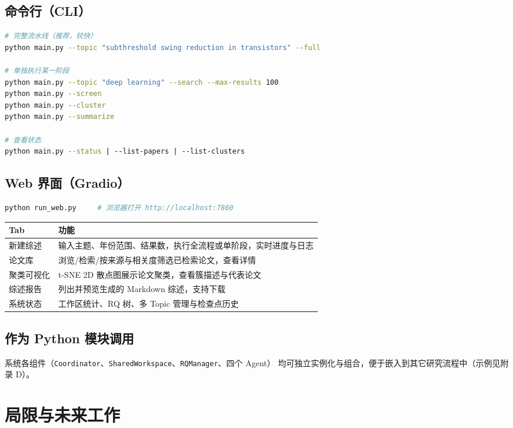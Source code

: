 \documentclass[10pt,a4paper]{article}
\begin{document}
\subsection{命令行（CLI）}
\begin{lstlisting}[language=bash]
# 完整流水线（推荐，较快）
python main.py --topic "subthreshold swing reduction in transistors" --full

# 单独执行某一阶段
python main.py --topic "deep learning" --search --max-results 100
python main.py --screen
python main.py --cluster
python main.py --summarize

# 查看状态
python main.py --status | --list-papers | --list-clusters
\end{lstlisting}

\subsection{Web 界面（Gradio）}
\begin{lstlisting}[language=bash]
python run_web.py     # 浏览器打开 http://localhost:7860
\end{lstlisting}
\begin{center}\small
\begin{tabularx}{\linewidth}{lY}
\toprule
\textbf{Tab} & \textbf{功能} \\
\midrule
新建综述       & 输入主题、年份范围、结果数，执行全流程或单阶段，实时进度与日志 \\
论文库         & 浏览/检索/按来源与相关度筛选已检索论文，查看详情 \\
聚类可视化     & t-SNE 2D 散点图展示论文聚类，查看簇描述与代表论文 \\
综述报告       & 列出并预览生成的 Markdown 综述，支持下载 \\
系统状态       & 工作区统计、RQ 树、多 Topic 管理与检查点历史 \\
\bottomrule
\end{tabularx}
\end{center}

\subsection{作为 Python 模块调用}
系统各组件（\texttt{Coordinator}、\texttt{SharedWorkspace}、\texttt{RQManager}、四个 Agent）
均可独立实例化与组合，便于嵌入到其它研究流程中（示例见附录 D）。

\section{局限与未来工作}
\end{document}
